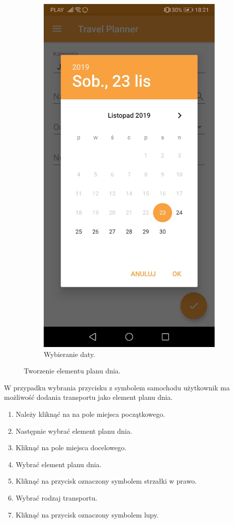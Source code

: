 \documentclass[10pt,twoside,a4paper]{report}
\begin{document}
\begin{figure}[h]
\begin{subfigure}{0.5\textwidth}
\includegraphics[width=0.9\linewidth, width=5cm]{calendar}
\caption{Wybieranie daty.}
\label{fig:calendar}
\end{subfigure}
\caption{Tworzenie elementu planu dnia.}
\label{fig:podrecznik7}
\end{figure}
\FloatBarrier

W przypadku wybrania przycisku z symbolem samochodu użytkownik ma możliwość dodania transportu jako element planu dnia.
\begin{enumerate}
\item Należy kliknąć na na pole miejsca początkowego.
\item Następnie wybrać element planu dnia.
\item Kliknąć na pole miejsca docelowego.
\item Wybrać element planu dnia.
\item Kliknąć na przycisk oznaczony symbolem strzałki w prawo.
\item Wybrać rodzaj transportu.
\item Kliknąć na przycisk oznaczony symbolem lupy.
\end{enumerate}
\end{document}
